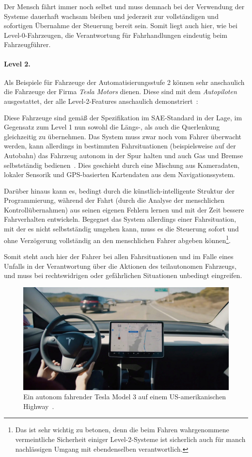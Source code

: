\documentclass[twocolumn, german]{tum-article}
\begin{document}
Der Mensch fährt immer noch selbst und muss demnach bei der Verwendung der Systeme dauerhaft wachsam bleiben und jederzeit zur vollständigen und sofortigen Übernahme der Steuerung bereit sein.
Somit liegt auch hier, wie bei Level-0-Fahrzeugen, die Verantwortung für Fahrhandlungen eindeutig beim Fahrzeugführer.
	
	
\paragraph{Level 2.}
Als Beispiele für Fahrzeuge der Automatisierungsstufe 2 können sehr anschaulich die Fahrzeuge der Firma \emph{Tesla Motors} dienen.
Diese sind mit dem \emph{Autopiloten} ausgestattet, der alle Level-2-Features anschaulich demonstriert~\cite{tesla-ap}:
	
Diese Fahrzeuge sind gemäß der Spezifikation im SAE-Standard in der Lage, im Gegensatz zum Level 1 nun sowohl die Längs-, als auch die Querlenkung gleichzeitig zu übernehmen.
Das System muss zwar noch vom Fahrer überwacht werden, kann allerdings in bestimmten Fahrsituationen (beispielsweise auf der Autobahn) das Fahrzeug autonom in der Spur halten und auch Gas und Bremse selbstständig bedienen~\cite[S. 1]{bast-levels}.
Dies geschieht durch eine Mischung aus Kameradaten, lokaler Sensorik und GPS-basierten Kartendaten aus dem Navigationssystem.
	
Darüber hinaus kann es, bedingt durch die künstlich-intelligente Struktur der Programmierung, während der Fahrt (durch die Analyse der menschlichen Kontrollübernahmen) aus seinen eigenen Fehlern lernen und mit der Zeit bessere Fahrverhalten entwickeln.
Begegnet das System allerdings einer Fahrsituation, mit der es nicht selbstständig umgehen kann, muss es die Steuerung sofort und ohne Verzögerung vollständig an den menschlichen Fahrer abgeben können\footnote{Das ist sehr wichtig zu betonen, denn die beim Fahren wahrgenommene vermeintliche Sicherheit einiger Level-2-Systeme ist sicherlich auch für manch nachlässigen Umgang mit ebendenselben verantwortlich.}.
	
Somit steht auch hier der Fahrer bei allen Fahrsituationen und im Falle eines Unfalls in der Verantwortung über die Aktionen des teilautonomen Fahrzeugs, und muss bei rechtswidrigen oder gefährlichen Situationen unbedingt eingreifen.


\begin{figure}
	\includegraphics[width=\linewidth]{media/tesla-ap-dash}
	\caption{Ein autonom fahrender Tesla Model 3 auf einem US-amerikanischen Highway~\cite{tesla-ap-dash}.}
	\label{fig:tesla-autonomous}
\end{figure}
\end{document}
